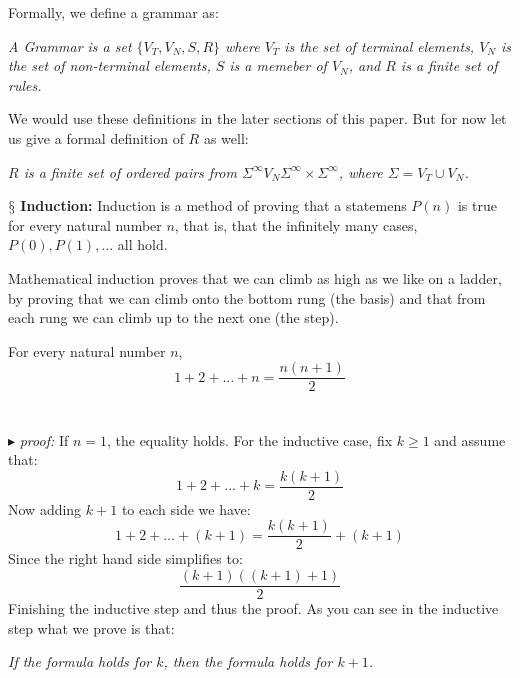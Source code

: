 \documentclass[10pt,a4paper]{article}
\newcounter{theo}
\newcommand{\newpoint}[1]{\indent$\mathsection$ \textbf{#1}}
\newcommand{\proof}{\\ \ \\ $\blacktriangleright$ \textit{proof: }}
\begin{document}
                    Formally, we define a grammar as:
                    \begin{define}
                        \textit{A Grammar is a set $\{V_T,V_N,S, R\}$ where $V_T$ is the set of terminal elements, $V_N$ is the set of non-terminal elements, $S$ is a memeber of $V_N$, and $R$ is a finite set of rules.}
                    \end{define}
                    We would use these definitions in the later sections of this paper. But for now let us give a formal definition of $R$ as well:\cite{Leary2019-ip}
                    \begin{define}
                        \textit{$R$ is a finite set of ordered pairs from $\Sigma^\infty V_N \Sigma^\infty\times \Sigma^\infty$, where $\Sigma = V_T\cup V_N$.}
                    \end{define}
                    \newpoint{Induction:} Induction is a method of proving that a statemens $P(n)$ is true for every natural number $n$, that is, that the infinitely many cases, $P(0), P(1),\dots$ all hold. \cite{enwiki:1157726892}
                    \begin{qt}
                        Mathematical induction proves that we can climb as high as we like on a ladder, by proving that we can climb onto the bottom rung (the basis) and that from each rung we can climb up to the next one (the step).
                    \end{qt}
                    \begin{theorem}
                        For every natural number $n$,
                        \begin{equation}
                            1+2+\dots + n = \frac{n(n+1)}{2}
                        \end{equation}
                    \
                    \proof If $n=1$, the equality holds. For the inductive case, fix $k\geq 1$ and assume that:
                    \begin{equation}
                        1+2+\dots+k =\frac{k(k+1)}{2}
                    \end{equation}
                    Now adding $k+1$ to each side we have:
                    \begin{equation}
                        1+2+\dots+(k+1) = \frac{k(k+1)}{2}+(k+1)
                    \end{equation}
                    Since the right hand side simplifies to:
                    \begin{equation}
                        \frac{(k+1)((k+1) + 1)}{2}
                    \end{equation}
                    Finishing the inductive step and thus the proof. As you can see in the inductive step what we prove is that:
                    \begin{qt}
                        \textit{If the formula holds for $k$, then the formula holds for $k+1$.}
                    \end{qt}
                    \end{theorem}
\end{document}
